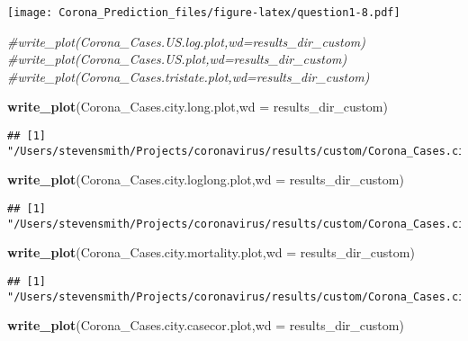 \documentclass[]{article}
\newenvironment{Shaded}{\begin{snugshade}}{\end{snugshade}}
\newcommand{\KeywordTok}[1]{\textcolor[rgb]{0.13,0.29,0.53}{\textbf{{#1}}}}
\newcommand{\DataTypeTok}[1]{\textcolor[rgb]{0.13,0.29,0.53}{{#1}}}
\newcommand{\CommentTok}[1]{\textcolor[rgb]{0.56,0.35,0.01}{\textit{{#1}}}}
\newcommand{\NormalTok}[1]{{#1}}
\begin{document}
\texttt{[image: Corona\_Prediction\_files/figure-latex/question1-8.pdf]}

\begin{Shaded}
\begin{Highlighting}[]
\CommentTok{#write_plot(Corona_Cases.US.log.plot,wd=results_dir_custom)}
\CommentTok{#write_plot(Corona_Cases.US.plot,wd=results_dir_custom)}
\CommentTok{#write_plot(Corona_Cases.tristate.plot,wd=results_dir_custom)}


\KeywordTok{write_plot}\NormalTok{(Corona_Cases.city.long.plot,}\DataTypeTok{wd =} \NormalTok{results_dir_custom)}
\end{Highlighting}
\end{Shaded}

\begin{verbatim}
## [1] "/Users/stevensmith/Projects/coronavirus/results/custom/Corona_Cases.city.long.plot.png"
\end{verbatim}

\begin{Shaded}
\begin{Highlighting}[]
\KeywordTok{write_plot}\NormalTok{(Corona_Cases.city.loglong.plot,}\DataTypeTok{wd =} \NormalTok{results_dir_custom)}
\end{Highlighting}
\end{Shaded}

\begin{verbatim}
## [1] "/Users/stevensmith/Projects/coronavirus/results/custom/Corona_Cases.city.loglong.plot.png"
\end{verbatim}

\begin{Shaded}
\begin{Highlighting}[]
\KeywordTok{write_plot}\NormalTok{(Corona_Cases.city.mortality.plot,}\DataTypeTok{wd =} \NormalTok{results_dir_custom)}
\end{Highlighting}
\end{Shaded}

\begin{verbatim}
## [1] "/Users/stevensmith/Projects/coronavirus/results/custom/Corona_Cases.city.mortality.plot.png"
\end{verbatim}

\begin{Shaded}
\begin{Highlighting}[]
\KeywordTok{write_plot}\NormalTok{(Corona_Cases.city.casecor.plot,}\DataTypeTok{wd =} \NormalTok{results_dir_custom)}
\end{Highlighting}
\end{Shaded}
\end{document}
